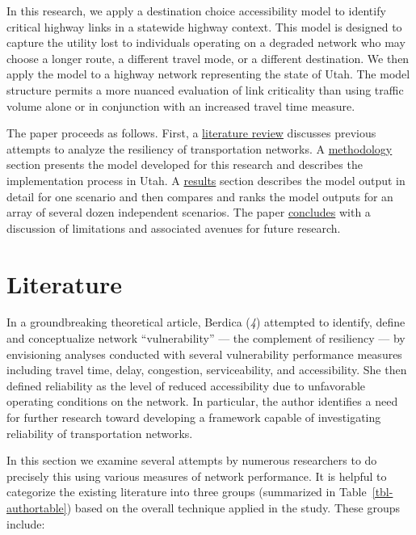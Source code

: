 \documentclass[
  letterpaper,
]{trb}
\begin{document}
In this research, we apply a destination choice accessibility model to
identify critical highway links in a statewide highway context. This
model is designed to capture the utility lost to individuals operating
on a degraded network who may choose a longer route, a different travel
mode, or a different destination. We then apply the model to a highway
network representing the state of Utah. The model structure permits a
more nuanced evaluation of link criticality than using traffic volume
alone or in conjunction with an increased travel time measure.

The paper proceeds as follows. First, a
\protect\hyperlink{litreview}{literature review} discusses previous
attempts to analyze the resiliency of transportation networks. A
\protect\hyperlink{methodology}{methodology} section presents the model
developed for this research and describes the implementation process in
Utah. A \protect\hyperlink{results}{results} section describes the model
output in detail for one scenario and then compares and ranks the model
outputs for an array of several dozen independent scenarios. The paper
\protect\hyperlink{conclusion}{concludes} with a discussion of
limitations and associated avenues for future research.


\hypertarget{litreview}{%
\section{Literature}\label{litreview}}

In a groundbreaking theoretical article, Berdica (\emph{4}) attempted to
identify, define and conceptualize network ``vulnerability'' --- the
complement of resiliency --- by envisioning analyses conducted with
several vulnerability performance measures including travel time, delay,
congestion, serviceability, and accessibility. She then defined
reliability as the level of reduced accessibility due to unfavorable
operating conditions on the network. In particular, the author
identifies a need for further research toward developing a framework
capable of investigating reliability of transportation networks.

In this section we examine several attempts by numerous researchers to
do precisely this using various measures of network performance. It is
helpful to categorize the existing literature into three groups
(summarized in Table~\ref{tbl-authortable}) based on the overall
technique applied in the study. These groups include:
\end{document}

